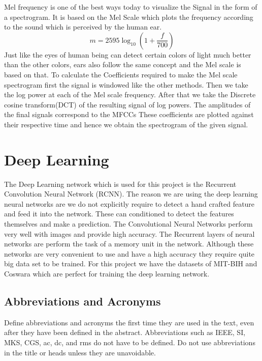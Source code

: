 \documentclass[conference]{IEEEtran}
\begin{document}
Mel frequency is one of the best ways today to visualize the Signal in the form of a spectrogram. It is based on the Mel Scale which plots the frequency according to the sound which is perceived by the human ear. 
\begin{equation}
    m = 2595\log_{10}{(1+\frac{f}{700})}
\end{equation}
Just like the eyes of human being can detect certain colors of light much better than the other colors, ears also follow the same concept and the Mel scale is based on that. To calculate the Coefficients required to make the Mel scale spectrogram first the signal is windowed like the other methods. Then we take the log power at each of the Mel scale frequency. After that we take the Discrete cosine transform(DCT) of the resulting signal of log powers. The amplitudes of the final signals correspond to the MFCCs These coefficients are plotted against their respective time and hence we obtain the spectrogram of the given signal. 

\section{Deep Learning}

The Deep Learning network which is used for this project is the Recurrent Convolution Neural Network (RCNN). The reason we are using the deep learning neural networks are we do not explicitly require to detect a hand crafted feature and feed it into the network. These can conditioned to detect the features themselves and make a prediction. The Convolutional Neural Networks perform very well with images and provide high accuracy. The Recurrent layers of neural networks are perform the task of a memory unit in the network. Although these networks are very convenient to use and have a high accuracy they require quite big data set to be trained. For this project we have the datasets of MIT-BIH and Coswara which are perfect for training the deep learning network.


\subsection{Abbreviations and Acronyms}\label{AA}
Define abbreviations and acronyms the first time they are used in the text, 
even after they have been defined in the abstract. Abbreviations such as 
IEEE, SI, MKS, CGS, ac, dc, and rms do not have to be defined. Do not use 
abbreviations in the title or heads unless they are unavoidable.
\end{document}
